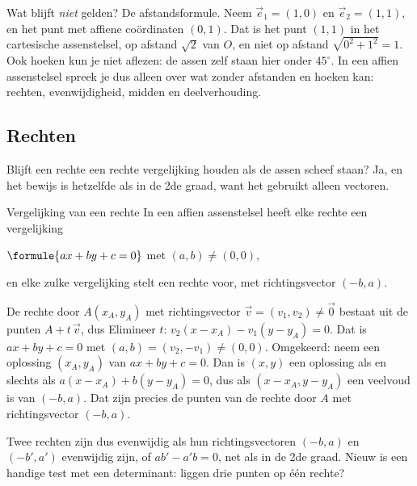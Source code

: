 Wat blijft \textit{niet} gelden? De afstandsformule. Neem $\vec e_1 = (1, 0)$ en $\vec e_2 = (1, 1)$, en het punt met affiene coördinaten $(0, 1)$. Dat is het punt $(1, 1)$ in het cartesische assenstelsel, op afstand $\sqrt2$ van $O$, en niet op afstand $\sqrt{0^2 + 1^2} = 1$. Ook hoeken kun je niet aflezen: de assen zelf staan hier onder $45^\circ$. In een affien assenstelsel spreek je dus alleen over wat zonder afstanden en hoeken kan: rechten, evenwijdigheid, midden en deelverhouding.

\subsection{Rechten}

Blijft een rechte een rechte vergelijking houden als de assen scheef staan? Ja, en het bewijs is hetzelfde als in de 2de graad, want het gebruikt alleen vectoren.

\begin{theorie}
\begin{stelling}{Vergelijking van een rechte}
In een affien assenstelsel heeft elke rechte een vergelijking

\vspace{1mm}
\qquad $\formule{ax + by + c = 0}$ \qquad met $(a, b) \neq (0, 0)$,

\vspace{1mm}
en elke zulke vergelijking stelt een rechte voor, met richtingsvector $(-b, a)$.
\end{stelling}

\begin{bewijs}
De rechte door $A(x_A, y_A)$ met richtingsvector $\vec v = (v_1, v_2) \neq \vec 0$ bestaat uit de punten $A + t\,\vec v$, dus
Elimineer $t$: $v_2(x - x_A) - v_1(y - y_A) = 0$. Dat is $ax + by + c = 0$ met $(a, b) = (v_2, -v_1) \neq (0, 0)$. Omgekeerd: neem een oplossing $(x_A, y_A)$ van $ax + by + c = 0$. Dan is $(x, y)$ een oplossing als en slechts als $a(x - x_A) + b(y - y_A) = 0$, dus als $(x - x_A, y - y_A)$ een veelvoud is van $(-b, a)$. Dat zijn precies de punten van de rechte door $A$ met richtingsvector $(-b, a)$.
\end{bewijs}
\end{theorie}

Twee rechten zijn dus evenwijdig als hun richtingsvectoren $(-b, a)$ en $(-b', a')$ evenwijdig zijn, of $ab' - a'b = 0$, net als in de 2de graad. Nieuw is een handige test met een determinant: liggen drie punten op één rechte?

